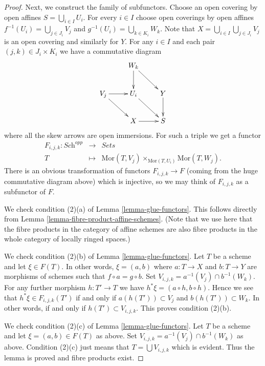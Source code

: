 \begin{proof}
\medskip\noindent
Next, we construct the family of subfunctors.
Choose an open covering by open affines
$S = \bigcup\nolimits_{i \in I} U_i$.
For every $i \in I$ choose open coverings by open affines
$f^{-1}(U_i) = \bigcup\nolimits_{j \in J_i} V_j$ and
$g^{-1}(U_i) = \bigcup\nolimits_{k \in K_i} W_k$.
Note that $X = \bigcup_{i \in I} \bigcup_{j \in J_i} V_j$
is an open covering and similarly for $Y$.
For any $i \in I$ and each pair $(j, k) \in J_i \times K_i$
we have a commutative diagram
$$
\xymatrix{
    & W_k \ar[d] \ar[rd] &   \\
V_j \ar[rd] \ar[r] & U_i \ar[rd] & Y \ar[d] \\
    & X \ar[r]  & S
}
$$
where all the skew arrows are open immersions. For such a
triple we get a functor
\begin{eqnarray*}
F_{i, j, k} : \textit{Sch}^{opp} & \longrightarrow & \textit{Sets} \\
T & \longmapsto &
\text{Mor}(T, V_j) \times_{\text{Mor}(T, U_i)} \text{Mor}(T, W_j).
\end{eqnarray*}
There is an obvious transformation of functors $F_{i, j, k} \to F$
(coming from the huge commutative diagram above)
which is injective, so we may think of $F_{i, j, k}$ as a subfunctor
of $F$.

\medskip\noindent
We check condition (2)(a) of Lemma \ref{lemma-glue-functors}.
This follows directly from Lemma \ref{lemma-fibre-product-affine-schemes}.
(Note that we use here that the fibre products in the category of
affine schemes are also fibre products in the whole category of locally
ringed spaces.)

\medskip\noindent
We check condition (2)(b) of Lemma \ref{lemma-glue-functors}.
Let $T$ be a scheme and let $\xi \in F(T)$. In other words,
$\xi = (a, b)$ where $a : T \to X$ and $b : T \to Y$ are
morphisms of schemes such that $f \circ a = g \circ b$.
Set $V_{i, j, k} = a^{-1}(V_j) \cap b^{-1}(W_k)$. For any
further morphism $h : T' \to T$ we have
$h^*\xi = (a \circ h, b \circ h)$. Hence we see that
$h^*\xi \in F_{i, j, k}(T')$ if and only if
$a(h(T')) \subset V_j$ and $b(h(T')) \subset W_k$.
In other words, if and only if $h(T') \subset V_{i, j, k}$.
This proves condition (2)(b).

\medskip\noindent
We check condition (2)(c) of Lemma \ref{lemma-glue-functors}.
Let $T$ be a scheme and let $\xi = (a, b) \in F(T)$ as above.
Set $V_{i, j, k} = a^{-1}(V_j) \cap b^{-1}(W_k)$ as above.
Condition (2)(c) just means that $T = \bigcup V_{i, j, k}$
which is evident. Thus the lemma is proved and fibre products
exist.
\end{proof}

